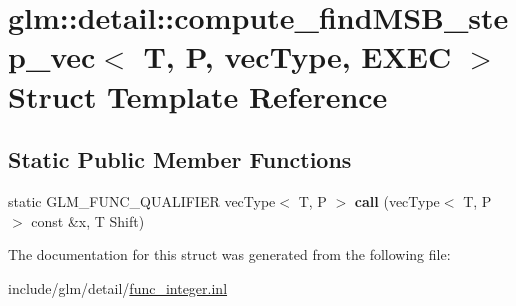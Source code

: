 \hypertarget{structglm_1_1detail_1_1compute__findMSB__step__vec}{}\section{glm\+:\+:detail\+:\+:compute\+\_\+find\+M\+S\+B\+\_\+step\+\_\+vec$<$ T, P, vec\+Type, E\+X\+EC $>$ Struct Template Reference}
\label{structglm_1_1detail_1_1compute__findMSB__step__vec}
\subsection*{Static Public Member Functions}
\begin{DoxyCompactItemize}
\item 
\mbox{\label{structglm_1_1detail_1_1compute__findMSB__step__vec_af4ab89696a02cfcbc5d96dff9e92521c}} 
static G\+L\+M\+\_\+\+F\+U\+N\+C\+\_\+\+Q\+U\+A\+L\+I\+F\+I\+ER vec\+Type$<$ T, P $>$ {\bfseries call} (vec\+Type$<$ T, P $>$ const \&x, T Shift)
\end{DoxyCompactItemize}


The documentation for this struct was generated from the following file\+:\begin{DoxyCompactItemize}
\item 
include/glm/detail/\hyperlink{func__integer_8inl}{func\+\_\+integer.\+inl}\end{DoxyCompactItemize}
